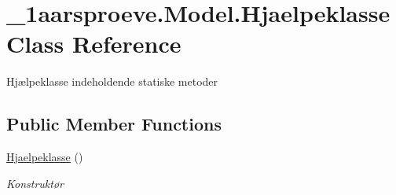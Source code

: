 \hypertarget{class__1aarsproeve_1_1_model_1_1_hjaelpeklasse}{}\section{\+\_\+1aarsproeve.\+Model.\+Hjaelpeklasse Class Reference}
\label{class__1aarsproeve_1_1_model_1_1_hjaelpeklasse}


Hjælpeklasse indeholdende statiske metoder  


\subsection*{Public Member Functions}
\begin{DoxyCompactItemize}
\item 
\hyperlink{class__1aarsproeve_1_1_model_1_1_hjaelpeklasse_aa8a10c7e1c930f2054480b2446d9ea77}{Hjaelpeklasse} ()
\begin{DoxyCompactList}\small\item\em Konstruktør \end{DoxyCompactList}\end{DoxyCompactItemize}
